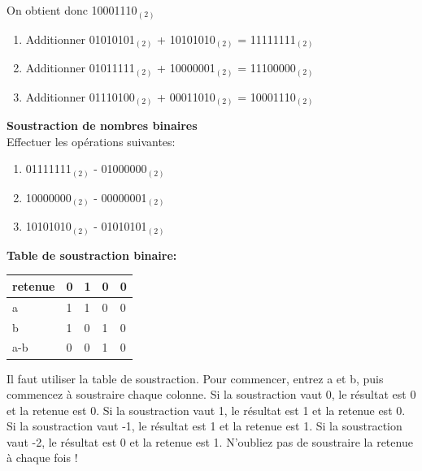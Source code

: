 \begin{Exercice}[15 minutes]
\begin{solution}
        On obtient donc 10001110$_{(2)}$ \\
        \begin{enumerate}
            \item Additionner 01010101$_{(2)}$ + 10101010$_{(2)}$ = 11111111$_{(2)}$
            \item Additionner 01011111$_{(2)}$ + 10000001$_{(2)}$ = 11100000$_{(2)}$
            \item Additionner 01110100$_{(2)}$ + 00011010$_{(2)}$ = 10001110$_{(2)}$
        \end{enumerate}

    \end{solution}
\end{Exercice}

\begin{Exercice}[15 minutes] \textbf{Soustraction de nombres binaires}\\
    Effectuer les opérations suivantes:

    \begin{enumerate}
        \item 01111111$_{(2)}$ - 01000000$_{(2)}$
        \item 10000000$_{(2)}$ - 00000001$_{(2)}$
        \item 10101010$_{(2)}$ - 01010101$_{(2)}$
    \end{enumerate}

    \begin{conseil}
        \textbf{Table de soustraction binaire:}\\
         \begin{tabular}{| C{0.1\textwidth} | C{0.1\textwidth} | C{0.1\textwidth} | C{0.1\textwidth} | C{0.1\textwidth} |} 
            \hline
            retenue & 0 & 1 & 0 & 0 \\ [0.5ex] 
            \hline
            a & 1 & 1 & 0 & 0 \\ [0.5ex] 
            \hline
            b & 1 & 0 & 1 & 0 \\ [0.5ex] 
            \hline
            a-b & 0 & 0 & 1 & 0 \\ [0.5ex] 
            \hline
        \end{tabular}
    \end{conseil}
    \begin{solution}
        Il faut utiliser la table de soustraction. Pour commencer, entrez a et b, puis commencez à soustraire chaque colonne. Si la soustraction vaut 0, le résultat est 0 et la retenue est 0. Si la soustraction vaut 1, le résultat est 1 et la retenue est 0. Si la soustraction vaut -1, le résultat est 1 et la retenue est 1. Si la soustraction vaut -2, le résultat est 0 et la retenue est 1. N'oubliez pas de soustraire la retenue à chaque fois ! \\



\end{solution}
\end{Exercice}
